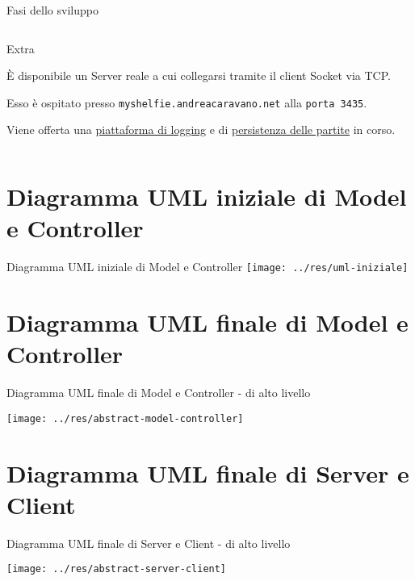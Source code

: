 \documentclass[aspectratio=1610,10.5pt]{beamer} %
\begin{document}
\begin{frame}{Fasi dello sviluppo}
\begin{columns}
\begin{column}{0.4\textwidth}
\begin{block}{Extra}
                {\small È disponibile un Server reale a cui collegarsi tramite il client Socket via TCP.\par}
                    \hfill \linebreak
                    {\small Esso è ospitato presso \texttt{myshelfie.andreacaravano.net} alla \texttt{porta 3435}.\par}
                    \hfill \linebreak
                    {\small Viene offerta una \href{http://myshelfie.andreacaravano.net/log/}{piattaforma di logging} e di \href{http://myshelfie.andreacaravano.net/games-persistency/}{persistenza delle partite} in corso.\par}
                \end{block}
            \end{column}
        \end{columns}
    \end{frame}


    \section{Diagramma UML iniziale di Model e Controller}\label{sec:diagramma-uml-iniziale-di-model-e-controller}
    \begin{frame}{Diagramma UML iniziale di Model e Controller}
        \texttt{[image: ../res/uml-iniziale]}
    \end{frame}


    \section{Diagramma UML finale di Model e Controller}\label{sec:diagramma-uml-finale-di-model-e-controller}
    \begin{frame}{Diagramma UML finale di Model e Controller - di alto livello}
        \begin{center}
            \texttt{[image: ../res/abstract-model-controller]}
        \end{center}
    \end{frame}


    \section{Diagramma UML finale di Server e Client}\label{sec:diagramma-uml-finale-di-server-e-client}
    \begin{frame}{Diagramma UML finale di Server e Client - di alto livello}
        \begin{center}
            \texttt{[image: ../res/abstract-server-client]}
        \end{center}
    \end{frame}
\end{document}
